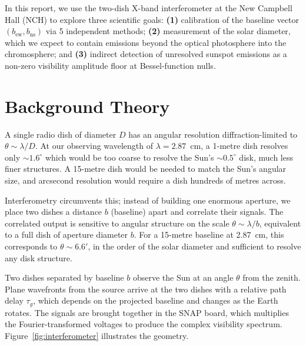 \documentclass[10pt,preprint2]{aastex}
\begin{document}
In this report, we use the two-dish X-band interferometer at the New Campbell Hall (NCH) to explore three scientific goals: \textbf{(1)} calibration of the baseline vector $(b_{\mathrm{ew}}, b_{\mathrm{ns}})$ via 5 independent methods; \textbf{(2)} measurement of the solar diameter, which we expect to contain emissions beyond the optical photosphere into the chromosphere; and \textbf{(3)} indirect detection of unresolved sunspot emissions as a non-zero visibility amplitude floor at Bessel-function nulls.


\section{Background Theory}
\label{sec:theory}

A single radio dish of diameter $D$ has an angular resolution diffraction-limited to $\theta \sim \lambda/D$. At our observing wavelength of $\lambda = 2.87$~cm, a 1-metre dish resolves only $\sim$$1.6^\circ$ which would be too coarse to resolve the Sun's $\sim$$0.5^\circ$ disk, much less finer structures. A 15-metre dish would be needed to match the Sun's angular size, and arcsecond resolution would require a dish hundreds of metres across.

Interferometry circumvents this; instead of building one enormous aperture, we place two dishes a distance $b$ (baseline) apart and correlate their signals. The correlated output is sensitive to angular structure on the scale $\theta \sim \lambda/b$, equivalent to a full dish of aperture diameter $b$. For a 15-metre baseline at 2.87~cm, this corresponds to $\theta \sim 6.6'$, in the order of the solar diameter and sufficient to resolve any disk structure.

Two dishes separated by baseline $b$ observe the Sun at an angle $\theta$ from the zenith. Plane wavefronts from the source arrive at the two dishes with a relative path delay $\tau_g$, which depends on the projected baseline and changes as the Earth rotates. The signals are brought together in the SNAP board, which multiplies the Fourier-transformed voltages to produce the complex visibility spectrum. Figure~\ref{fig:interferometer} illustrates the geometry. 
\end{document}
